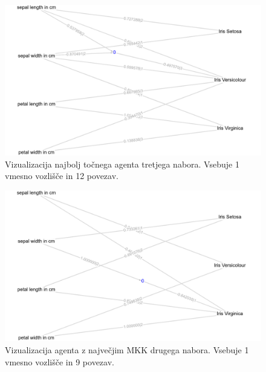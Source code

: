 \begin{figure}[H]
    \begin{center}
        \includegraphics[width=13cm]{iris/3/acc_g}
    \end{center}
    \caption{Vizualizacija najbolj točnega agenta tretjega nabora. Vsebuje 1 vmesno vozlišče in 12 povezav.}
    \label{fig:iris_acc_3_g}
\end{figure}

\begin{figure}[H]
    \begin{center}
        \includegraphics[width=13cm]{iris/3/mcc_g}
    \end{center}
    \caption{Vizualizacija agenta z največjim MKK drugega nabora. Vsebuje 1 vmesno vozlišče in 9 povezav.}
    \label{fig:iris_mcc_3_g}
\end{figure}